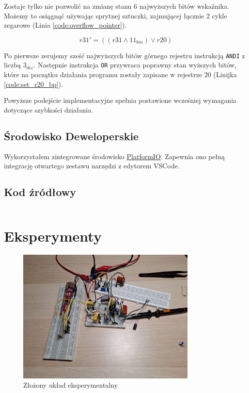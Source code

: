 \documentclass[12pt, a4paper]{article}
\begin{document}
Zostaje tylko nie  pozwolić na zmianę stanu 6 najwyższych bitów wskaźnika.
Możemy to osiągnąć używając sprytnej sztuczki, zajmującej łącznie 2 cykle zegarowe (Linia \ref{code:overflow_pointer}).

\begin{equation}
	r31' = \left( \left( r31 \land 11_{bin} \right) \lor r20 \right)
\end{equation}

Po pierwsze zerujemy sześć najwyższych bitów górnego rejestru instrukcją \verb|ANDI| z liczbą $3_{dec}$.
Następnie instrukcja \verb|OR| przywraca poprawny stan wyższych bitów, 
które na początku działania programu zostały zapisane w rejestrze 20 (Linijka \ref{code:set_r20_bp}).

Powyższe podejście implementacyjne spełnia postawione wcześniej wymagania dotyczące szybkości działania.


\subsection{Środowisko Deweloperskie}
Wykorzystałem zintegrowane środowisko \href{https://platformio.org/}{PlatformIO}.
Zapewnia ono pełną integrację otwartego zestawu narzędzi z edytorem VSCode.

\subsection{Kod źródłowy}

\inputminted[linenos=true,escapeinside=@@,fontfamily=phv]{asm}{../code/src/main.S}


\section{Eksperymenty}
\begin{figure}[h]
	\centering
	\includegraphics[width=0.8\textwidth]{img/experimental_setup.jpg}
	\caption{Złożony układ eksperymentalny}
	
\end{figure}
\end{document}
